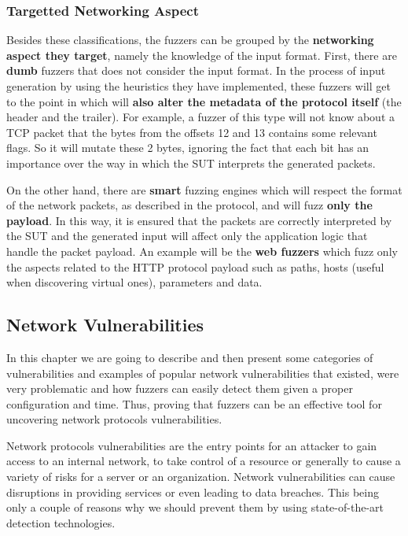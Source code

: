 \documentclass[10pt,a4paper,english,onecolumn]{IEEEtran}
\begin{document}
\subsubsection{Targetted Networking Aspect}

Besides these classifications, the fuzzers can be grouped by the \textbf{networking aspect they target}, namely the knowledge of the input format. First, there are \textbf{dumb} fuzzers that does not consider the input format. In the process of input generation by using the heuristics they have implemented, these fuzzers will get to the point in which will \textbf{also alter the metadata of the protocol itself} (the header and the trailer). For example, a fuzzer of this type will not know about a TCP packet that the bytes from the offsets 12 and 13 contains some relevant flags. So it will mutate these 2 bytes, ignoring the fact that each bit has an importance over the way in which the SUT interprets the generated packets.

On the other hand, there are \textbf{smart} fuzzing engines which will respect the format of the network packets, as described in the protocol, and will fuzz \textbf{only the payload}. In this way, it is ensured that the packets are correctly interpreted by the SUT and the generated input will affect only the application logic that handle the packet payload. An example will be the \textbf{web fuzzers} which fuzz only the aspects related to the HTTP protocol payload such as paths, hosts (useful when discovering virtual ones), parameters and data.

\subsection{Network Vulnerabilities}

In this chapter we are going to describe and then present some categories of vulnerabilities and examples of popular network vulnerabilities that existed, were very problematic and how fuzzers can easily detect them given a proper configuration and time. Thus, proving that fuzzers can be an effective tool for uncovering network protocols vulnerabilities.

Network protocols vulnerabilities are the entry points for an attacker to gain access to an internal network, to take control of a resource or generally to cause a variety of risks for a server or an organization. Network vulnerabilities can cause disruptions in providing services or even leading to data breaches. This being only a couple of reasons why we should prevent them by using state-of-the-art detection technologies.
\end{document}
